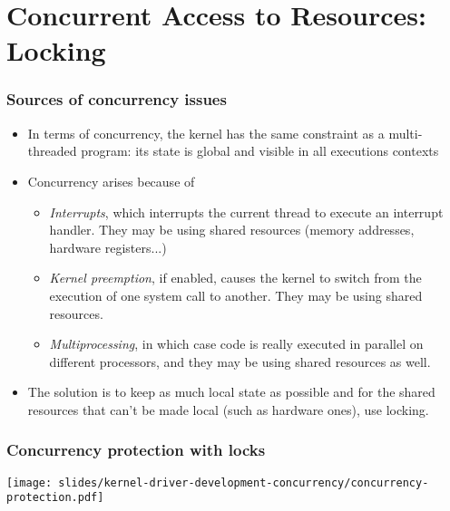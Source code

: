 \section{Concurrent Access to Resources: Locking}

\begin{frame}
  \frametitle{Sources of concurrency issues}
  \begin{itemize}
  \item In terms of concurrency, the kernel has the same constraint
    as a multi-threaded program: its state is global and visible
    in all executions contexts
  \item Concurrency arises because of
    \begin{itemize}
    \item \emph{Interrupts}, which interrupts the current thread to
      execute an interrupt handler. They may be using shared
      resources (memory addresses, hardware registers...)
    \item \emph{Kernel preemption}, if enabled, causes the kernel to
      switch from the execution of one system call to another. They
      may be using shared resources.
    \item \emph{Multiprocessing}, in which case code is really
      executed in parallel on different processors, and they may be
      using shared resources as well.
    \end{itemize}
  \item The solution is to keep as much local state as possible and
    for the shared resources that can't be made local (such as
    hardware ones), use locking.
  \end{itemize}
\end{frame}

\begin{frame}
  \frametitle{Concurrency protection with locks}
  \begin{center}
    \texttt{[image: slides/kernel-driver-development-concurrency/concurrency-protection.pdf]}
  \end{center}
\end{frame}

